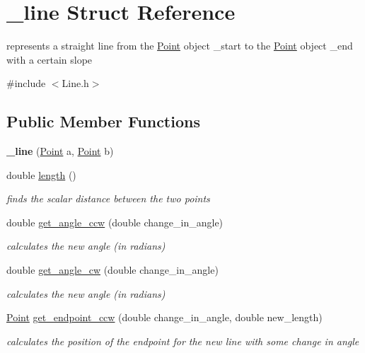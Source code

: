 \hypertarget{struct__line}{}\section{\+\_\+line Struct Reference}
\label{struct__line}


represents a straight line from the \mbox{\hyperlink{struct_point}{Point}} object \+\_\+start to the \mbox{\hyperlink{struct_point}{Point}} object \+\_\+end with a certain slope  




{\ttfamily \#include $<$Line.\+h$>$}

\subsection*{Public Member Functions}
\begin{DoxyCompactItemize}
\item 
\mbox{\label{struct__line_a016cc0785a680ccea5824cd8e6a19a68}} 
{\bfseries \+\_\+line} (\mbox{\hyperlink{struct_point}{Point}} a, \mbox{\hyperlink{struct_point}{Point}} b)
\item 
double \mbox{\hyperlink{struct__line_a76c04baae77c11c3199f488c16bfce61}{length}} ()
\begin{DoxyCompactList}\small\item\em finds the scalar distance between the two points \end{DoxyCompactList}\item 
double \mbox{\hyperlink{struct__line_ae49c65726376062a08113a96fcda65d6}{get\+\_\+angle\+\_\+ccw}} (double change\+\_\+in\+\_\+angle)
\begin{DoxyCompactList}\small\item\em calculates the new angle (in radians) \end{DoxyCompactList}\item 
double \mbox{\hyperlink{struct__line_a4182e9dc8bedf189355c1e6af67b2fc4}{get\+\_\+angle\+\_\+cw}} (double change\+\_\+in\+\_\+angle)
\begin{DoxyCompactList}\small\item\em calculates the new angle (in radians) \end{DoxyCompactList}\item 
\mbox{\hyperlink{struct_point}{Point}} \mbox{\hyperlink{struct__line_a80acbbf95632aa4a0b976f417e95951e}{get\+\_\+endpoint\+\_\+ccw}} (double change\+\_\+in\+\_\+angle, double new\+\_\+length)
\begin{DoxyCompactList}\small\item\em calculates the position of the endpoint for the new line with some change in angle \end{DoxyCompactList}\item 

\end{DoxyCompactItemize}
